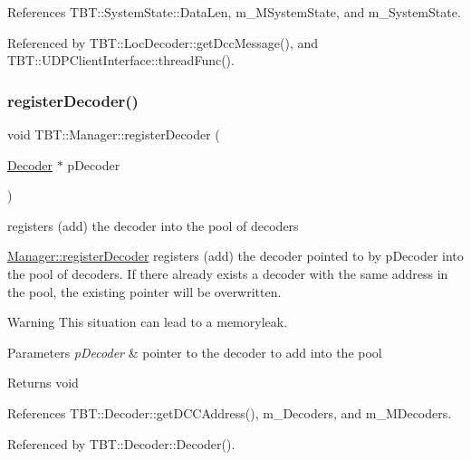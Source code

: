 References T\+B\+T\+::\+System\+State\+::\+Data\+Len, m\+\_\+\+M\+System\+State, and m\+\_\+\+System\+State.



Referenced by T\+B\+T\+::\+Loc\+Decoder\+::get\+Dcc\+Message(), and T\+B\+T\+::\+U\+D\+P\+Client\+Interface\+::thread\+Func().

\mbox{\label{classTBT_1_1Manager_a7b20f8a47d78cfd39649722a9fba2f7c_a7b20f8a47d78cfd39649722a9fba2f7c}} 
\subsubsection{\texorpdfstring{register\+Decoder()}{registerDecoder()}}
{\footnotesize\ttfamily void T\+B\+T\+::\+Manager\+::register\+Decoder (\begin{DoxyParamCaption}\item[{\hyperlink{classTBT_1_1Decoder}{Decoder} $\ast$}]{p\+Decoder }\end{DoxyParamCaption})}



registers (add) the decoder into the pool of decoders 

\hyperlink{classTBT_1_1Manager_a7b20f8a47d78cfd39649722a9fba2f7c_a7b20f8a47d78cfd39649722a9fba2f7c}{Manager\+::register\+Decoder} registers (add) the decoder pointed to by p\+Decoder into the pool of decoders. If there already exists a decoder with the same address in the pool, the existing pointer will be overwritten. \begin{DoxyWarning}{Warning}
This situation can lead to a memoryleak.
\end{DoxyWarning}

\begin{DoxyParams}{Parameters}
{\em p\+Decoder} & pointer to the decoder to add into the pool\\
\hline
\end{DoxyParams}
\begin{DoxyReturn}{Returns}
void 
\end{DoxyReturn}


References T\+B\+T\+::\+Decoder\+::get\+D\+C\+C\+Address(), m\+\_\+\+Decoders, and m\+\_\+\+M\+Decoders.



Referenced by T\+B\+T\+::\+Decoder\+::\+Decoder().

